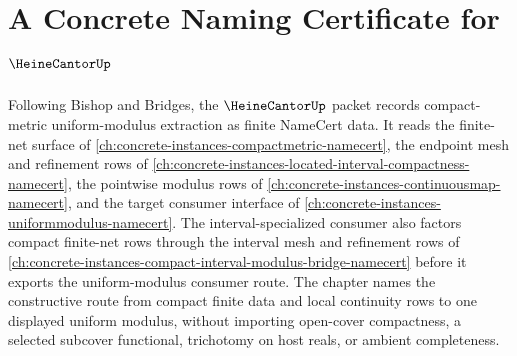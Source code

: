 \chapter{A Concrete Naming Certificate for $\HeineCantorUp$}
\label{ch:concrete-instances-heine-cantor-namecert}

Following Bishop and Bridges, the $\HeineCantorUp$ packet records compact-metric uniform-modulus extraction as finite NameCert data. It reads the finite-net surface of \autoref{ch:concrete-instances-compactmetric-namecert}, the endpoint mesh and refinement rows of \autoref{ch:concrete-instances-located-interval-compactness-namecert}, the pointwise modulus rows of \autoref{ch:concrete-instances-continuousmap-namecert}, and the target consumer interface of \autoref{ch:concrete-instances-uniformmodulus-namecert}. The interval-specialized consumer also factors compact finite-net rows through the interval mesh and refinement rows of \autoref{ch:concrete-instances-compact-interval-modulus-bridge-namecert} before it exports the uniform-modulus consumer route. The chapter names the constructive route from compact finite data and local continuity rows to one displayed uniform modulus, without importing open-cover compactness, a selected subcover functional, trichotomy on host reals, or ambient completeness.

